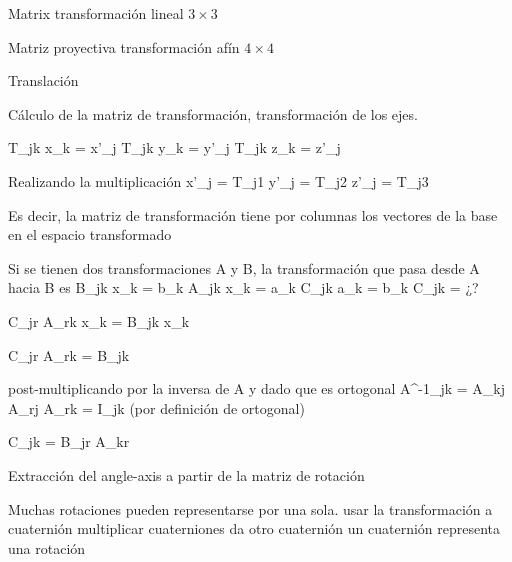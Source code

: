 Matrix transformación lineal $3\times3$

Matriz proyectiva transformación afín $4\times4$

Translación

Cálculo de la matriz de transformación,
transformación de los ejes.

T_{jk} x_{k} = {x'}_{j}
T_{jk} y_{k} = {y'}_{j}
T_{jk} z_{k} = {z'}_{j}

Realizando la multiplicación
{x'}_j = T_{j1}
{y'}_j = T_{j2}
{z'}_j = T_{j3}

Es decir, la matriz de transformación tiene por columnas los vectores de la base en el espacio transformado

Si se tienen dos transformaciones A y B, la transformación que pasa desde A hacia B es
B_jk x_k = b_k
A_jk x_k = a_k
C_jk a_k = b_k
C_jk = ¿?


C_jr A_rk x_k = B_jk x_k

C_jr A_rk = B_jk

post-multiplicando por la inversa de A
y dado que es ortogonal A^-1_jk = A_kj
A_rj A_rk = I_jk (por definición de ortogonal) 

C_jk = B_jr A_kr


Extracción del angle-axis a partir de la matriz de rotación


Muchas rotaciones pueden representarse por una sola. 
usar la transformación a cuaternión
multiplicar cuaterniones da otro cuaternión
un cuaternión representa una rotación
